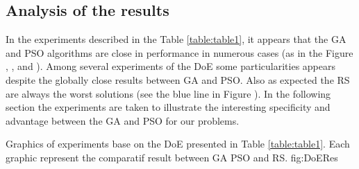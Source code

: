 

\subsection{Analysis of the results }
In the experiments described in the Table \ref{table:table1}, it appears that the GA and PSO algorithms are close in performance in numerous cases (as in the Figure , ,  and ). Among several experiments of the DoE some particularities appears despite the globally close results between GA and PSO. Also as expected the RS are always the worst solutions (see the blue line  in Figure ).
 In the following section the experiments are taken to illustrate the interesting specificity and advantage between the GA and PSO for our problems.
\newpage 
 \begin{mfigures}[H]{Graphics of experiments  base on the DoE presented in Table \ref{table:table1}. Each graphic represent the comparatif result between GA PSO and RS.  }{fig:DoERes} \centering
{}
\hspace{0.5cm}
\hspace{0.6cm}
\hspace{.6cm}

\end{mfigures}   


